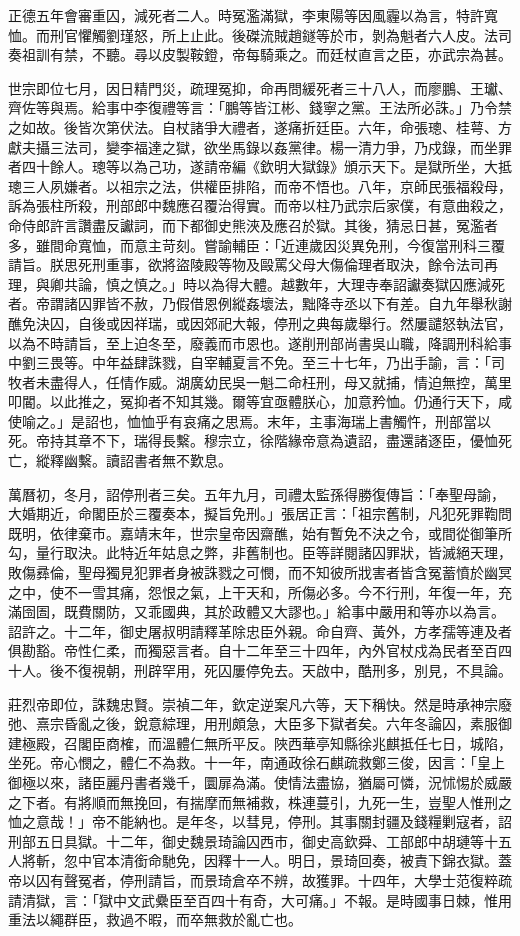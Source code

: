 正德五年會審重囚，減死者二人。時冤濫滿獄，李東陽等因風霾以為言，特許寬恤。而刑官懼觸劉瑾怒，所上止此。後磔流賊趙鐩等於市，剝為魁者六人皮。法司奏祖訓有禁，不聽。尋以皮製鞍鐙，帝每騎乘之。而廷杖直言之臣，亦武宗為甚。

世宗即位七月，因日精門災，疏理冤抑，命再問緩死者三十八人，而廖鵬、王瓛、齊佐等與焉。給事中李復禮等言：「鵬等皆江彬、錢寧之黨。王法所必誅。」乃令禁之如故。後皆次第伏法。自杖諸爭大禮者，遂痛折廷臣。六年，命張璁、桂萼、方獻夫攝三法司，變李福達之獄，欲坐馬錄以姦黨律。楊一清力爭，乃戍錄，而坐罪者四十餘人。璁等以為己功，遂請帝編《欽明大獄錄》頒示天下。是獄所坐，大抵璁三人夙嫌者。以祖宗之法，供權臣排陷，而帝不悟也。八年，京師民張福殺母，訴為張柱所殺，刑部郎中魏應召覆治得實。而帝以柱乃武宗后家僕，有意曲殺之，命侍郎許言讚盡反讞詞，而下都御史熊浹及應召於獄。其後，猜忌日甚，冤濫者多，雖間命寬恤，而意主苛刻。嘗諭輔臣：「近連歲因災異免刑，今復當刑科三覆請旨。朕思死刑重事，欲將盜陵殿等物及毆罵父母大傷倫理者取決，餘令法司再理，與卿共論，慎之慎之。」時以為得大體。越數年，大理寺奉詔讞奏獄囚應減死者。帝謂諸囚罪皆不赦，乃假借恩例縱姦壞法，黜降寺丞以下有差。自九年舉秋謝醮免決囚，自後或因祥瑞，或因郊祀大報，停刑之典每歲舉行。然屢譴怒執法官，以為不時請旨，至上迫冬至，廢義而市恩也。遂削刑部尚書吳山職，降調刑科給事中劉三畏等。中年益肆誅戮，自宰輔夏言不免。至三十七年，乃出手諭，言：「司牧者未盡得人，任情作威。湖廣幼民吳一魁二命枉刑，母又就捕，情迫無控，萬里叩閽。以此推之，冤抑者不知其幾。爾等宜亟體朕心，加意矜恤。仍通行天下，咸使喻之。」是詔也，恤恤乎有哀痛之思焉。末年，主事海瑞上書觸忤，刑部當以死。帝持其章不下，瑞得長繫。穆宗立，徐階緣帝意為遺詔，盡還諸逐臣，優恤死亡，縱釋幽繫。讀詔書者無不歎息。

萬曆初，冬月，詔停刑者三矣。五年九月，司禮太監孫得勝復傳旨：「奉聖母諭，大婚期近，命閣臣於三覆奏本，擬旨免刑。」張居正言：「祖宗舊制，凡犯死罪鞫問既明，依律棄市。嘉靖末年，世宗皇帝因齋醮，始有暫免不決之令，或間從御筆所勾，量行取決。此特近年姑息之弊，非舊制也。臣等詳閱諸囚罪狀，皆滅絕天理，敗傷彞倫，聖母獨見犯罪者身被誅戮之可憫，而不知彼所戕害者皆含冤蓄憤於幽冥之中，使不一雪其痛，怨恨之氣，上干天和，所傷必多。今不行刑，年復一年，充滿囹圄，既費關防，又乖國典，其於政體又大謬也。」給事中嚴用和等亦以為言。詔許之。十二年，御史屠叔明請釋革除忠臣外親。命自齊、黃外，方孝孺等連及者俱勘豁。帝性仁柔，而獨惡言者。自十二年至三十四年，內外官杖戍為民者至百四十人。後不復視朝，刑辟罕用，死囚屢停免去。天啟中，酷刑多，別見，不具論。

莊烈帝即位，誅魏忠賢。崇禎二年，欽定逆案凡六等，天下稱快。然是時承神宗廢弛、熹宗昏亂之後，銳意綜理，用刑頗急，大臣多下獄者矣。六年冬論囚，素服御建極殿，召閣臣商榷，而溫體仁無所平反。陜西華亭知縣徐兆麒抵任七日，城陷，坐死。帝心憫之，體仁不為救。十一年，南通政徐石麒疏救鄭三俊，因言：「皇上御極以來，諸臣麗丹書者幾千，圜扉為滿。使情法盡協，猶屬可憐，況怵惕於威嚴之下者。有將順而無挽回，有揣摩而無補救，株連蔓引，九死一生，豈聖人惟刑之恤之意哉！」帝不能納也。是年冬，以彗見，停刑。其事關封疆及錢糧剿寇者，詔刑部五日具獄。十二年，御史魏景琦論囚西市，御史高欽舜、工部郎中胡璉等十五人將斬，忽中官本清銜命馳免，因釋十一人。明日，景琦回奏，被責下錦衣獄。蓋帝以囚有聲冤者，停刑請旨，而景琦倉卒不辨，故獲罪。十四年，大學士范復粹疏請清獄，言：「獄中文武纍臣至百四十有奇，大可痛。」不報。是時國事日棘，惟用重法以繩群臣，救過不暇，而卒無救於亂亡也。


